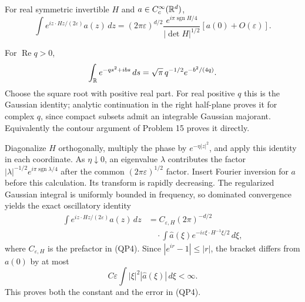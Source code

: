 \begin{lemma}
For real symmetric invertible $H$ and $a\in C_c^\infty(\mathbb{R}^d)$,
\[
 \int e^{iz\cdot Hz/(2\varepsilon)}a(z)\,dz
 =(2\pi\varepsilon)^{d/2}
   \frac{e^{i\pi\operatorname{sgn}H/4}}{|\det H|^{1/2}}
      [a(0)+O(\varepsilon)].
 \tag{QP4}
\]
\end{lemma}
\begin{expandedproof}
For $\operatorname{Re}q>0$,
\[
 \int_{\mathbb{R}} e^{-qs^2+ibs}\,ds=\sqrt{\pi}\,q^{-1/2}e^{-b^2/(4q)} .
\]
Choose the square root with positive real part.
For real positive $q$ this is the Gaussian identity; analytic
continuation in the right half-plane proves it for complex $q$,
since compact subsets admit an integrable Gaussian majorant.
Equivalently the contour argument of Problem 15 proves it directly.

Diagonalize $H$ orthogonally, multiply the phase by
$e^{-\eta|z|^2}$, and apply this identity in each coordinate.
As $\eta\downarrow0$, an eigenvalue $\lambda$ contributes the factor
$|\lambda|^{-1/2}e^{i\pi\operatorname{sgn}\lambda/4}$ after the common
$(2\pi\varepsilon)^{1/2}$ factor.
Insert Fourier inversion for $a$ before this calculation.
Its transform is rapidly decreasing.
The regularized Gaussian integral is uniformly bounded in frequency,
so dominated convergence yields the exact oscillatory identity
\[
 \begin{aligned}
 \int e^{iz\cdot Hz/(2\varepsilon)}a(z)\,dz
 &=C_{\varepsilon,H}(2\pi)^{-d/2}\\
 &\quad\cdot\int \widehat a(\xi)
                e^{-i\varepsilon\xi\cdot H^{-1}\xi/2}\,d\xi ,
 \end{aligned}
\]
where $C_{\varepsilon,H}$ is the prefactor in (QP4).
Since $|e^{ir}-1|\leq|r|$, the bracket differs from $a(0)$ by at most
\[
 C\varepsilon\int |\xi|^2|\widehat a(\xi)|\,d\xi<\infty .
\]
This proves both the constant and the error in (QP4).
\end{expandedproof}

